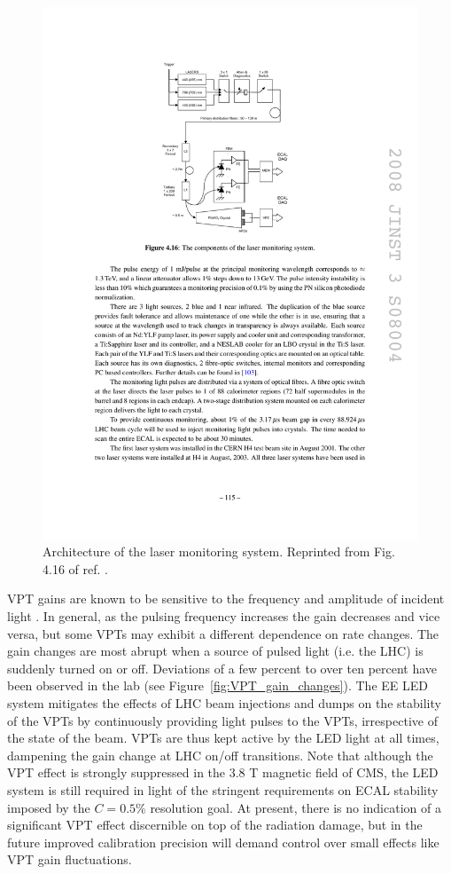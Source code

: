 \documentclass[dissertation.tex]{subfiles}
\begin{document}
\begin{figure}
	\centering
	\includegraphics[scale=1.0]{ECAL_laser_system}
	\caption{Architecture of the laser monitoring system.  Reprinted from Fig. 4.16 of ref. \cite{1748-0221-3-08-S08004}.}
	\label{fig:ECAL_laser_system}
\end{figure}

VPT gains are known to be sensitive to the frequency and amplitude of incident light \cite{Akopdzhanov1979247}.  In general, as the pulsing frequency increases the gain decreases and vice versa, but some VPTs may exhibit a different dependence on rate changes.  The gain changes are most abrupt when a source of pulsed light (i.e. the LHC) is suddenly turned on or off.  Deviations of a few percent to over ten percent have been observed in the lab (see Figure~\ref{fig:VPT_gain_changes}).  The EE LED system mitigates the effects of LHC beam injections and dumps on the stability of the VPTs by continuously providing light pulses to the VPTs, irrespective of the state of the beam.  VPTs are thus kept active by the LED light at all times, dampening the gain change at LHC on/off transitions.  Note that although the VPT effect is strongly suppressed in the 3.8 T magnetic field of CMS, the LED system is still required in light of the stringent requirements on ECAL stability imposed by the $C = 0.5\%$ resolution goal.  At present, there is no indication of a significant VPT effect discernible on top of the radiation damage, but in the future improved calibration precision will demand control over small effects like VPT gain fluctuations.
\end{document}
